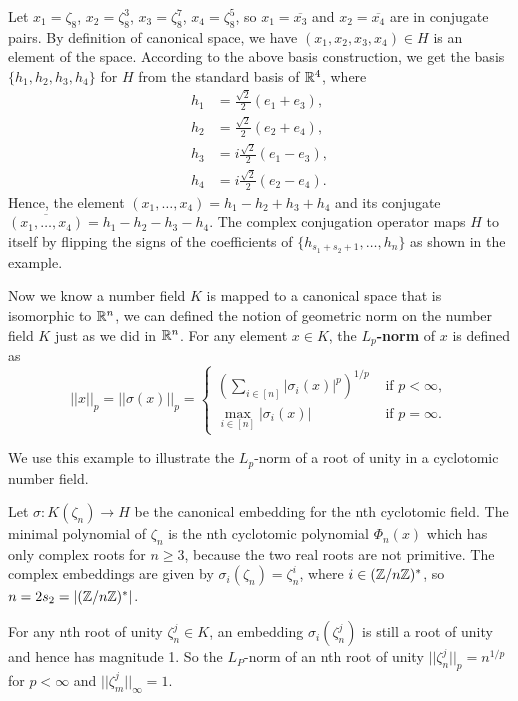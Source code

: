 \documentclass[../main.tex]{subfiles}
\begin{document}
\begin{example}
Let $x_1 = \zeta_8$, $x_2 = \zeta_8^3$, $x_3 = \zeta_8^7$, $x_4 = \zeta_8^5$, so $x_1 = \overline{x_3}$ and $x_2 = \overline{x_4}$ are in conjugate pairs. By definition of canonical space, we have $(x_1, x_2, x_3, x_4) \in H$ is an element of the space. According to the above basis construction, we get the basis $\{h_1, h_2,h_3,h_4\}$ for $H$ from the standard basis of $\mathbb{R}^4$, where
\begin{align*}
h_1 &= \frac{\sqrt{2}}{2} (e_1 + e_3), \\
h_2 &= \frac{\sqrt{2}}{2} (e_2 + e_4),\\
h_3 &= i\frac{\sqrt{2}}{2} (e_1 - e_3),\\
h_4 &= i\frac{\sqrt{2}}{2} (e_2 - e_4).    
\end{align*}
Hence, the element $(x_1, \dots, x_4) = h_1-h_2+h_3+h_4$ and its conjugate $\overline{(x_1, \dots, x_4)} = h_1-h_2-h_3-h_4$. The complex conjugation operator maps $H$ to itself by flipping the signs of the coefficients of $\{h_{s_1+s_2+1},\dots, h_n\}$ as shown in the example. 
\end{example}


Now we know a number field $K$ is mapped to a canonical space that is isomorphic to $\mathbb{R}^n$, we can defined the notion of geometric norm on the number field $K$ just as we did in $\mathbb{R}^n$. For any element $x \in K$, the \textbf{$L_p$-norm} of $x$ is defined as 
\reversemarginpar
{}
\begin{equation*}
    ||x||_p = ||\sigma(x)||_p = 
    \begin{cases}
     \left( \sum_{i \in [n]} |\sigma_i(x)|^p \right)^{1/p} & \text{ if $p < \infty$},  \\
    \max_{i \in [n]} |\sigma_i(x)| & \text{ if $p = \infty$}.
    \end{cases}
\end{equation*}

\begin{example}
We use this example to illustrate the $L_p$-norm of a root of unity in a cyclotomic number field. 

Let $\sigma: K(\zeta_n) \rightarrow H$ be the canonical embedding for the nth cyclotomic field. The minimal polynomial of $\zeta_n$ is the nth cyclotomic polynomial $\Phi_n(x)$ which has only complex roots for $n \ge 3$, because the two real roots are not primitive. The complex embeddings are given by $\sigma_i(\zeta_n) = \zeta_n^i$, where $i \in (\mathbb{Z}/n\mathbb{Z})^*$, so $n = 2s_2 = |(\mathbb{Z}/n\mathbb{Z})^*|$.

For any nth root of unity $\zeta_n^j \in K$, an embedding $\sigma_i(\zeta_n^j)$ is still a root of unity and hence has magnitude 1. So the $L_P$-norm of an nth root of unity $||\zeta_n^j||_p = n^{1/p}$ for $p < \infty$ and $||\zeta_m^j||_{\infty} = 1$.
\end{example}
\end{document}
